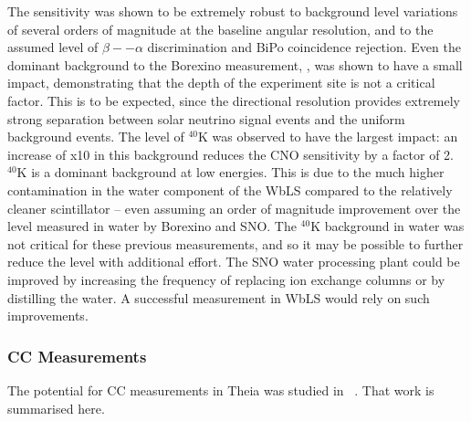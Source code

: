 The sensitivity was shown to be extremely robust to background level variations of several orders of magnitude at the baseline angular resolution, and to the assumed level of $\beta -- \alpha$ discrimination and BiPo coincidence  rejection.  Even the dominant background to the Borexino measurement, , was shown to have a small impact, demonstrating that the depth of the experiment site is not a critical factor.  This is to be expected, since the directional resolution provides extremely strong separation between solar neutrino signal events and the uniform background events.  The level of $^{40}$K was observed to have the largest impact: an increase of x10 in this background reduces the CNO sensitivity by a factor of 2.  
$^{40}$K is a dominant background at
low energies. This is due to the much higher contamination in the water component of the WbLS compared to the relatively cleaner scintillator -- even assuming an order of magnitude improvement over the level measured in water by Borexino and SNO. The $^{40}$K
background in water was not critical for these previous measurements, and so it may be
possible to further reduce the level with additional effort. The SNO water
processing plant could be improved by increasing the frequency of replacing ion
exchange columns or by distilling the water. A successful measurement in WbLS would rely on such improvements.

\subsubsection{CC Measurements}

The potential for CC measurements in Theia was studied in ~\cite{asdc}.  That work is summarised here.

